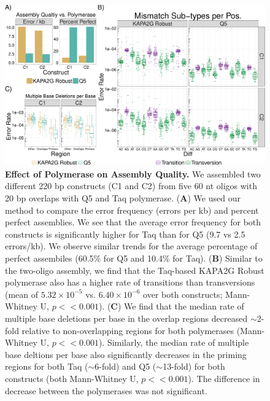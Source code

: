 \documentclass[twocolumn]{article}
\begin{document}
\clearpage
\begin{figure}[t]
\centering
\includegraphics[width=174mm]{Figure_5-1.pdf}
    \caption{\small \textbf{Effect of Polymerase on Assembly Quality.} We assembled two different 220 bp constructs (C1 and C2) from five 60 nt oligos with 20 bp overlaps with Q5 and Taq polymerase. (\textbf{A}) We used our method to compare the error frequency (errors per kb) and percent perfect assemblies. We see that the average error frequency for both constructs is significantly higher for Taq than for Q5 (9.7 vs 2.5 errors/kb). We observe similar trends for the average percentage of perfect assembiles (60.5\% for Q5 and 10.4\% for Taq). (\textbf{B}) Similar to the two-oligo assembly, we find that the Taq-based KAPA2G Robust polymerase also has a higher rate of transitions than transversions (mean of $5.32\times10^{-5}$ vs. $6.40\times10^{-6}$ over both constructs; Mann-Whitney U, $p<<0.001$). (\textbf{C}) We find that the median rate of multiple base deletions per base in the overlap regions decreased $\sim$2-fold relative to non-overlapping regions for both polymerases (Mann-Whitney U, $p << 0.001$). Similarly, the median rate of multiple base deltions per base also significantly decreases in the priming regions for both Taq ($\sim$6-fold) and Q5 ($\sim$13-fold) for both constructs (both Mann-Whitney U, $p << 0.001$). The difference in decrease between the polymerases was not significant.}
\end{figure}

\end{document}
